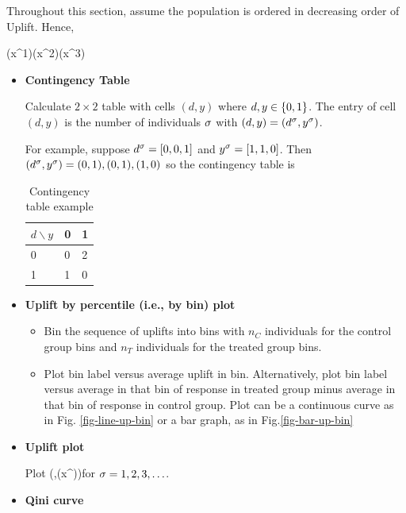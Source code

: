 Throughout this section, assume the population is ordered in decreasing 
order of Uplift. Hence,

\beq \delta(x^1)\geq \delta(x^2)\geq \delta(x^3)\geq \cdots
\eeq



\begin{itemize}
\item {\bf Contingency Table}

Calculate $2\times 2$ table with cells $(d, y)$
where $d, y\in\{0,1\}$. The entry of cell
$(d,y)$ is the number of individuals $\sigma$
with $(d,y)=(d^\sigma, y^\sigma)$.

For example, suppose $d^\sigma=[0,0,1]$
and $y^\sigma=[1,1,0]$. Then $(d^\sigma,y^\sigma)= (0,1), (0,1), (1,0)$
so the contingency table is

\begin{table}[h!]
\begin{tabular}{|l|l|l|}
\hline
$d \backslash y$ & \cellcolor[HTML]{FFFFC7}0 & \cellcolor[HTML]{FFFFC7}1 \\ \hline
\cellcolor[HTML]{FFFFC7}0 & 0 & 2 \\ \hline
\cellcolor[HTML]{FFFFC7}1 & 1 & 0 \\ \hline
\end{tabular}
\caption{Contingency table example}
\label{tab-con-tab}
\end{table}

\item {\bf Uplift by percentile (i.e., by bin) plot}

\begin{itemize}[\checkmark]
\item Bin the sequence of uplifts into bins with $n_C$ individuals
for the control group bins 
and $n_T$ individuals for the treated group bins.
\item Plot bin label versus average uplift in bin.
Alternatively, plot bin label versus average in that bin of response
in treated group minus average in that bin of response in control group.
Plot can be a continuous curve as in Fig. \ref{fig-line-up-bin}
or 
a bar graph, as in Fig.\ref{fig-bar-up-bin}

\end{itemize}

\item {\bf Uplift plot}

Plot \beq (\s,\delta(x^\s))\eeq for $\sigma=1,2,3, \ldots$.

\item {\bf Qini curve}


\end{itemize}
